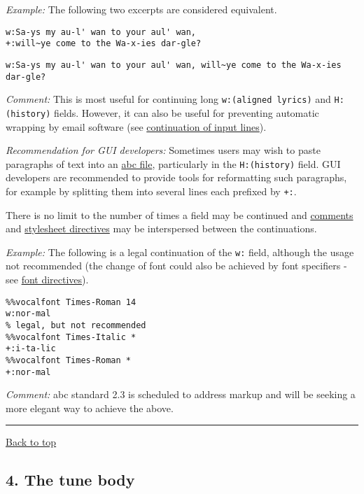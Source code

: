 \emph{Example:} The following two excerpts are considered equivalent.

\begin{verbatim}
w:Sa-ys my au-l' wan to your aul' wan,
+:will~ye come to the Wa-x-ies dar-gle?
\end{verbatim}

\begin{verbatim}
w:Sa-ys my au-l' wan to your aul' wan, will~ye come to the Wa-x-ies dar-gle?
\end{verbatim}

\emph{Comment:} This is most useful for continuing long
\texttt{w:(aligned\ lyrics)} and \texttt{H:(history)} fields. However,
it can also be useful for preventing automatic wrapping by email
software (see
\protect\hyperlink{continuation_of_input_lines}{continuation of input
lines}).

\emph{Recommendation for GUI developers:} Sometimes users may wish to
paste paragraphs of text into an
\protect\hyperlink{abc_file_definition}{abc file}, particularly in the
\texttt{H:(history)} field. GUI developers are recommended to provide
tools for reformatting such paragraphs, for example by splitting them
into several lines each prefixed by \texttt{+:}.

There is no limit to the number of times a field may be continued and
\protect\hyperlink{comments_and_remarks}{comments} and
\protect\hyperlink{stylesheet_directive_definition}{stylesheet
directives} may be interspersed between the continuations.

\emph{Example:} The following is a legal continuation of the \texttt{w:}
field, although the usage not recommended (the change of font could also
be achieved by font specifiers - see
\protect\hyperlink{font_directives}{font directives}).

\begin{verbatim}
%%vocalfont Times-Roman 14
w:nor-mal
% legal, but not recommended
%%vocalfont Times-Italic *
+:i-ta-lic
%%vocalfont Times-Roman *
+:nor-mal
\end{verbatim}

\emph{Comment:} abc standard 2.3 is scheduled to address markup and will
be seeking a more elegant way to achieve the above.

\begin{center}\rule{0.5\linewidth}{\linethickness}\end{center}

\protect\hyperlink{}{Back to top}

\hypertarget{the_tune_body}{\subsection{4. The tune
body}\label{the_tune_body}}

